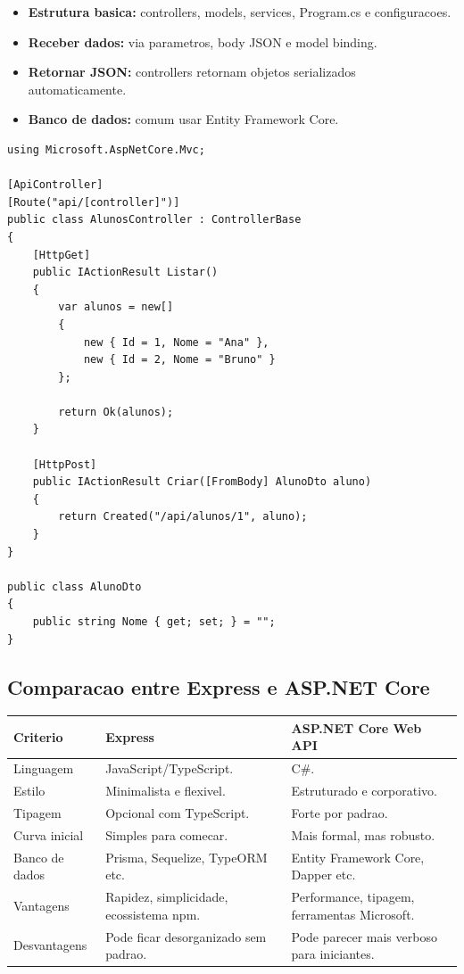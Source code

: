 \documentclass[12pt,a4paper]{article}
\begin{document}
\begin{itemize}
  \item \textbf{Estrutura basica:} controllers, models, services, Program.cs e configuracoes.
  \item \textbf{Receber dados:} via parametros, body JSON e model binding.
  \item \textbf{Retornar JSON:} controllers retornam objetos serializados automaticamente.
  \item \textbf{Banco de dados:} comum usar Entity Framework Core.
\end{itemize}

\begin{lstlisting}[caption={API simples com ASP.NET Core Web API}]
using Microsoft.AspNetCore.Mvc;

[ApiController]
[Route("api/[controller]")]
public class AlunosController : ControllerBase
{
    [HttpGet]
    public IActionResult Listar()
    {
        var alunos = new[]
        {
            new { Id = 1, Nome = "Ana" },
            new { Id = 2, Nome = "Bruno" }
        };

        return Ok(alunos);
    }

    [HttpPost]
    public IActionResult Criar([FromBody] AlunoDto aluno)
    {
        return Created("/api/alunos/1", aluno);
    }
}

public class AlunoDto
{
    public string Nome { get; set; } = "";
}
\end{lstlisting}

\subsection{Comparacao entre Express e ASP.NET Core}

\begin{tabularx}{\textwidth}{@{}L{3.2cm}Y Y@{}}
\toprule
\textbf{Criterio} & \textbf{Express} & \textbf{ASP.NET Core Web API} \\
\midrule
Linguagem & JavaScript/TypeScript. & C\#. \\
Estilo & Minimalista e flexivel. & Estruturado e corporativo. \\
Tipagem & Opcional com TypeScript. & Forte por padrao. \\
Curva inicial & Simples para comecar. & Mais formal, mas robusto. \\
Banco de dados & Prisma, Sequelize, TypeORM etc. & Entity Framework Core, Dapper etc. \\
Vantagens & Rapidez, simplicidade, ecossistema npm. & Performance, tipagem, ferramentas Microsoft. \\
Desvantagens & Pode ficar desorganizado sem padrao. & Pode parecer mais verboso para iniciantes. \\
\bottomrule
\end{tabularx}
\end{document}
